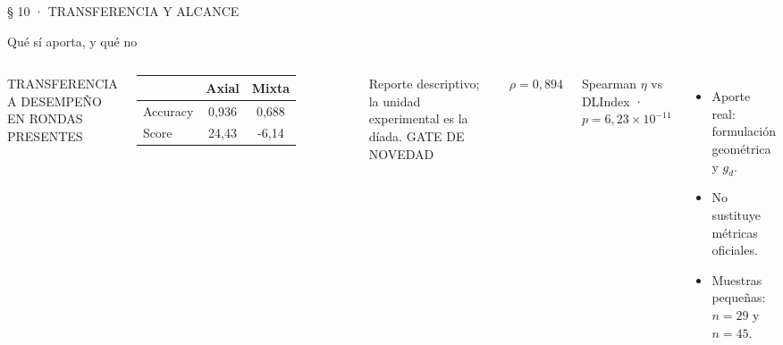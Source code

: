 \documentclass[aspectratio=169,11pt]{beamer}
\newcommand{\currentspeaker}{Thomas Chisica}
\newcommand{\eyebrow}[2][urMid]{%
  {\sffamily\fontsize{7.8pt}{9pt}\selectfont\color{#1}\MakeUppercase{#2}}\par\vspace{0.35em}}
\newcommand{\slidetitle}[2][urInk]{%
  {\rmfamily\fontsize{20.5pt}{23pt}\selectfont\color{#1}#2\par}%
  \vspace{0.18em}{\color{urBlue}\rule{2.35cm}{1.25pt}}\par\vspace{0.48em}}
\newcommand{\bignum}[2]{%
  {\sffamily\scriptsize\color{urMid}\MakeUppercase{#1}}\par
  {\rmfamily\fontsize{29pt}{31pt}\selectfont\color{urBlue}#2\par}}
\begin{document}
\renewcommand{\currentspeaker}{Sara Figueredo Laserna}
\begin{frame}[t]
  \eyebrow{§ 10 · Transferencia y alcance}
  \slidetitle{Qué sí aporta, y qué no}
  \begin{columns}[T,onlytextwidth]
      {\sffamily\small\color{urMid}\MakeUppercase{Transferencia a desempeño en rondas presentes}}\par
      \vspace{0.5em}
      \begin{tabular}{@{}lcc@{}}
        \toprule
        & Axial & Mixta\\
        \midrule
        Accuracy & 0,936 & 0,688\\
        Score & 24,43 & -6,14\\
        \bottomrule
      \end{tabular}
      \vspace{0.9em}
      {\sffamily\small\color{urMid}Reporte descriptivo; la unidad experimental es la díada.}
      \bignum{Gate de novedad}{$\rho=0{,}894$}
      {\sffamily\small\color{urMid}Spearman $\eta$ vs DLIndex · $p=6{,}23\times10^{-11}$\par}
      \vspace{0.9em}
      \begin{itemize}
        \item Aporte real: formulación geométrica y $g_d$.
        \item No sustituye métricas oficiales.
        \item Muestras pequeñas: $n=29$ y $n=45$.
      \end{itemize}
  \end{columns}
\end{frame}
\end{document}
